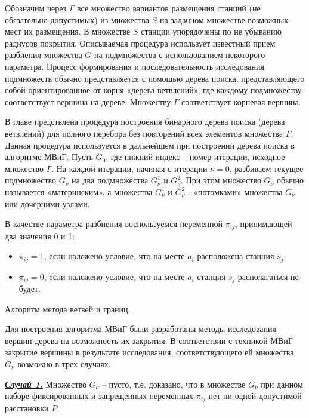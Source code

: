 

Обозначим через $\Gamma$ все множество вариантов размещения станций (не обязательно допустимых) из множества $S$ на заданном множестве возможных мест их размещения. В множестве $S$ станции упорядочены по не убыванию радиусов покрытия. 
Описываемая процедура использует известный прием разбиения множества $G$ на подмножества с использованием некоторого параметра. Процесс формирования и последовательность исследования подмножеств обычно представляется с помощью дерева поиска, представляющего собой ориентированное от корня «дерева ветвлений», где каждому подмножеству соответствует вершина на дереве. Множеству $\Gamma$ соответствует корневая вершина.

В главе предствлена процедура построения бинарного дерева поиска (дерева ветвлений) для полного перебора без повторений всех элементов множества $\Gamma$. Данная процедура используется в дальнейшем при построении дерева поиска в алгоритме МВиГ. Пусть $G_0$, где нижний индекс – номер итерации, исходное множество $\Gamma$. На каждой итерации, начиная с итерации $\nu=0$, разбиваем текущее подмножество $G_\nu$ на два подмножества $G^1_\nu$ и $G^2_\nu$. При этом множество $G_\nu$ обычно называется «материнским», а множества $G^1_\nu$  и $G^2_\nu$  - «потомками» множества $G_\nu$ или дочерними узлами.

В качестве параметра разбиения воспользуемся переменной $\pi_{ij}$, принимающей два значения 0 и 1:

\begin{itemize}
    \item $\pi_{ij}=1$, если наложено условие, что на месте $a_i$ расположена станция $s_j$;
    \item $\pi_{ij} = 0$, если наложено условие, что на месте $a_i$ станция $s_j$  располагаться не будет.
\end{itemize}

Алгоритм метода ветвей и границ.

Для построения алгоритма МВиГ были разработаны методы исследования вершин дерева на возможность их закрытия.
В соответствии с техникой МВиГ закрытие вершины в результате исследования, соответствующего ей множества $G_\nu$ возможно в трех случаях.

\underline{\textit{\textbf{Случай 1.}}} Множество $G_\nu$ -- пусто, т.е. доказано, что в множестве $G_\nu$ при данном наборе фиксированных и запрещенных переменных $\pi_{ij}$ нет ни одной допустимой расстановки $P$.

